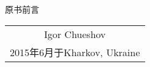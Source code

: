 \begin{PreChapter}{原书前言}
	\vspace{1em}
	\begin{flushright}
		\begin{minipage}{0.3 \textwidth}
			\begin{tabular}{c}
				{Igor Chueshov} \\
				2015年6月于Kharkov, Ukraine
			\end{tabular}
		\end{minipage}
	\end{flushright}

\end{PreChapter}	
	
	